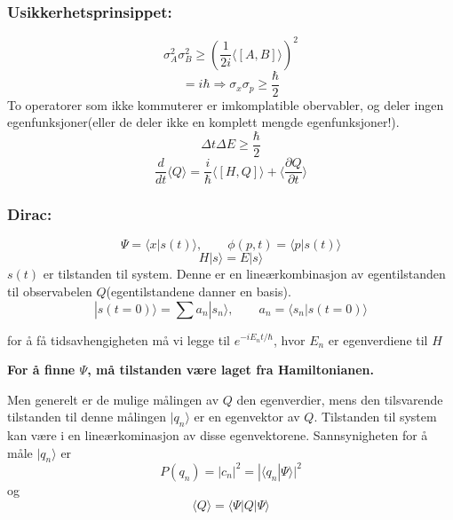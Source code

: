 \documentclass[a4paper,norsk, 10pt]{article}
\begin{document}
\subsubsection{Usikkerhetsprinsippet:}
\begin{equation}
\sigma_A^2 \sigma_B^2 \geq \left(\frac{1}{2i}\langle[A,B]\rangle\right)^2
\end{equation}
\begin{equation}
[x,p] = i\hbar \Rightarrow \sigma_x\sigma_p \geq \frac{\hbar}{2}
\end{equation}
To operatorer som ikke kommuterer er imkomplatible obervabler, og deler ingen egenfunksjoner(eller de deler ikke en komplett mengde egenfunksjoner!).
\begin{equation}
\Delta t \Delta E \geq \frac{\hbar}{2}
\end{equation}
\begin{equation}
\frac{d}{dt}\langle Q \rangle = \frac{i}{\hbar}\langle [H,Q]\rangle + \langle\frac{\partial Q}{\partial t}\rangle
\end{equation}

\subsubsection{Dirac:}
\begin{equation}
\Psi = \langle x|s(t)\rangle, \qquad \phi(p,t) = \langle p|s(t)\rangle
\end{equation}
\begin{equation}
H|s\rangle = E|s\rangle
\end{equation}
$s(t)$ er tilstanden til system. Denne er en lineærkombinasjon av egentilstanden til observabelen $Q$(egentilstandene danner en basis).
\begin{equation}
|s(t=0)\rangle = \sum a_n |s_n\rangle, \qquad a_n = \langle s_n|s(t=0)\rangle
\end{equation}

for å få tidsavhengigheten må vi legge til $e^{-iE_nt/\hbar}$, hvor $E_n$ er egenverdiene til $H$

\textbf{For å finne $\Psi$, må tilstanden være laget fra Hamiltonianen.}

Men generelt er de mulige målingen av $Q$ den egenverdier, mens den tilsvarende tilstanden til denne målingen $|q_n\rangle$ er en egenvektor av $Q$. Tilstanden til system kan være i en lineærkominasjon av disse egenvektorene. Sannsynigheten for å måle $|q_n\rangle$ er
\begin{equation}
P(q_n) = |c_n|^2 = |\langle q_n|\Psi\rangle	|^2
\end{equation}
og
\begin{equation}
\langle Q\rangle = \langle \Psi |Q|\Psi	\rangle
\end{equation}
\end{document}
